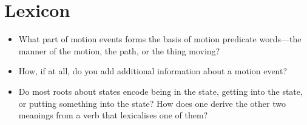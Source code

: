 \documentclass{article}
\begin{document}
\section{Lexicon}
\begin{itemize}
  \item What part of motion events forms the basis of motion predicate words---the manner of the motion, the path, or the thing moving?
  \item How, if at all, do you add additional information about a motion event?
  \item Do most roots about states encode being in the state, getting into the state, or putting something into the state? How does one derive the other two meanings from a verb that lexicalises one of them?
\end{itemize}
\end{document}
